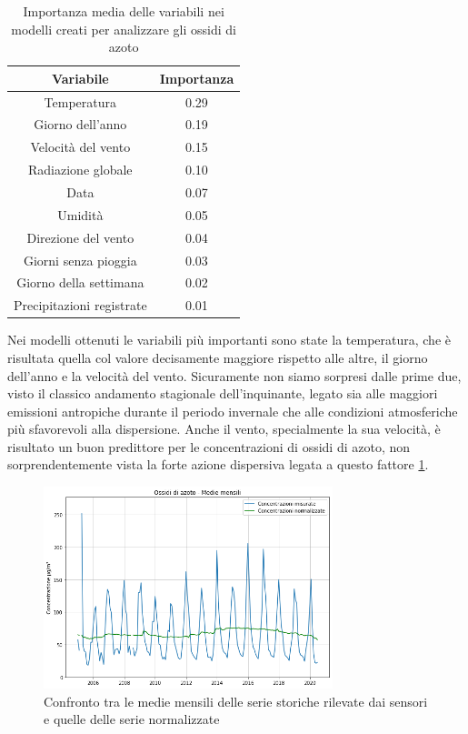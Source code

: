 \documentclass[a4paper]{report}
\begin{document}
\begin{table}[h!]
\centering
\begin{tabular}{ |c c| }
	\hline
	Variabile & Importanza \\
	\hline
	Temperatura & 0.29 \\
	Giorno dell'anno & 0.19 \\
	Velocità del vento & 0.15 \\
	Radiazione globale & 0.10 \\
	Data & 0.07 \\
	Umidità & 0.05 \\
	Direzione del vento & 0.04 \\
	Giorni senza pioggia & 0.03 \\
	Giorno della settimana & 0.02 \\
	Precipitazioni registrate & 0.01 \\
	\hline
\end{tabular}
\caption{Importanza media delle variabili nei modelli creati per analizzare gli ossidi di azoto}
\label{table:importanza_nox}
\end{table}

Nei modelli ottenuti le variabili più importanti sono state la temperatura, che è risultata quella col valore decisamente maggiore rispetto alle altre, il giorno dell'anno e la velocità del vento. Sicuramente non siamo sorpresi dalle prime due, visto il classico andamento stagionale dell'inquinante, legato sia alle maggiori emissioni antropiche durante il periodo invernale che alle condizioni atmosferiche più sfavorevoli alla dispersione. Anche il vento, specialmente la sua velocità, è risultato un buon predittore per le concentrazioni di ossidi di azoto, non sorprendentemente vista la forte azione dispersiva legata a questo fattore \ref{table:importanza_nox}.

\begin{figure}[h]
\centering
\includegraphics[width=0.75\textwidth]{nox_medie_mensili}
\caption{Confronto tra le medie mensili delle serie storiche rilevate dai sensori e quelle delle serie normalizzate}
\label{fig:nox_medie_mensili}
\end{figure}
\end{document}
